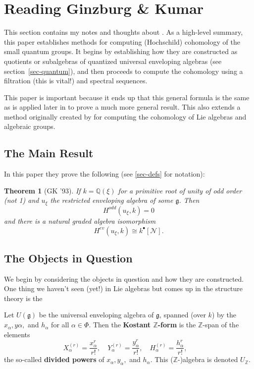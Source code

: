 \documentclass[12pt]{article}
\theoremstyle{nonumberbreak}
\theoremstyle{changebreak}
\newtheorem{thm}{Theorem}[subsection]
\theoremstyle{nonumberplain}
\theoremstyle{change}
\newcommand*{\bbZ}{\mathbb{Z}}
\newcommand*{\bbQ}{\mathbb{Q}}
\newcommand*{\g}{\mathfrak{g}}
\begin{document}
\newpage
\section{Reading Ginzburg \& Kumar}
This section contains my notes and thoughts about \cite{ginzburg-kumar}. As a high-level summary, this paper establishes
methods for computing (Hochschild) cohomology of the small quantum groups. It begins by establishing how they are constructed
as quotients or subalgebras of quantized universal enveloping algebras (see section~\ref{sec-quantum}), and then proceeds to compute
the cohomology using a filtration (this is vital!) and spectral sequences.

This paper is important because it ends up that this general formula is the same as is applied later in \cite{julia10-pointed} to prove
a much more general result. This also extends a method originally created by \cite{FP} for computing the cohomology of Lie algebras and
algebraic groups.

\subsection{The Main Result}
In this paper they prove the following (see \ref{sec-defs} for notation):
\begin{thm}[GK '93]
	If $k=\bbQ(\xi)$ for a primitive root of unity of odd order (not 1) and $u_\xi$ the restricted enveloping algebra of some $\g$. Then
	\[H^{odd}(u_\xi,k)=0\]
	and there is a natural graded algebra isomorphism
	\[H^{ev}(u_\xi,k)\cong k^\bullet[\mathcal N].\]
\end{thm}

\subsection{The Objects in Question}
We begin by considering the objects in question and how they are constructed. One thing we haven't seen (yet!) in Lie algebras
but comes up in the structure theory is the 
\begin{defn}[Kostant $\bbZ$-form]\label{def-kostant}
	Let $U(\g)$ be the universal enveloping algebra of $\g$, spanned (over $k$) by the $x_\alpha,y\alpha,$ and $h_\alpha$ for all $\alpha\in\Phi$. 
	Then the \textbf{Kostant $\bbZ$-form} is the $\bbZ$-span of the elements
	\[X^{(r)}_\alpha=\frac{x_\alpha^r}{r!},\quad Y^{(r)}_\alpha=\frac{y_\alpha^r}{r!},\quad H^{(r)}_\alpha=\frac{h_\alpha^r}{r!},\quad \]
	the so-called \textbf{divided powers} of $x_\alpha, y_\alpha,$ and $h_\alpha$. This ($\bbZ$-)algebra is denoted $U_\bbZ$.
\end{defn}
\end{document}
